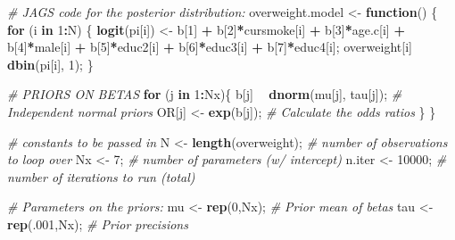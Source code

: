 \documentclass[
  11pt,
]{article}
\newenvironment{Shaded}{\begin{snugshade}}{\end{snugshade}}
\newcommand{\CommentTok}[1]{\textcolor[rgb]{0.56,0.35,0.01}{\textit{#1}}}
\newcommand{\ControlFlowTok}[1]{\textcolor[rgb]{0.13,0.29,0.53}{\textbf{#1}}}
\newcommand{\DecValTok}[1]{\textcolor[rgb]{0.00,0.00,0.81}{#1}}
\newcommand{\KeywordTok}[1]{\textcolor[rgb]{0.13,0.29,0.53}{\textbf{#1}}}
\newcommand{\NormalTok}[1]{#1}
\newcommand{\OperatorTok}[1]{\textcolor[rgb]{0.81,0.36,0.00}{\textbf{#1}}}
\newcommand{\StringTok}[1]{\textcolor[rgb]{0.31,0.60,0.02}{#1}}
\begin{document}
\begin{Shaded}
\begin{Highlighting}[]
\CommentTok{# JAGS code for the posterior distribution:}
\NormalTok{overweight.model <-}\StringTok{ }\ControlFlowTok{function}\NormalTok{() \{}
    \ControlFlowTok{for}\NormalTok{ (i }\ControlFlowTok{in} \DecValTok{1}\OperatorTok{:}\NormalTok{N) \{}
        \KeywordTok{logit}\NormalTok{(pi[i]) <-}\StringTok{ }
\StringTok{            }\NormalTok{b[}\DecValTok{1}\NormalTok{] }\OperatorTok{+}\StringTok{ }
\StringTok{            }\NormalTok{b[}\DecValTok{2}\NormalTok{]}\OperatorTok{*}\NormalTok{cursmoke[i] }\OperatorTok{+}\StringTok{ }
\StringTok{            }\NormalTok{b[}\DecValTok{3}\NormalTok{]}\OperatorTok{*}\NormalTok{age.c[i] }\OperatorTok{+}\StringTok{ }
\StringTok{            }\NormalTok{b[}\DecValTok{4}\NormalTok{]}\OperatorTok{*}\NormalTok{male[i] }\OperatorTok{+}\StringTok{ }
\StringTok{            }\NormalTok{b[}\DecValTok{5}\NormalTok{]}\OperatorTok{*}\NormalTok{educ2[i] }\OperatorTok{+}\StringTok{ }
\StringTok{            }\NormalTok{b[}\DecValTok{6}\NormalTok{]}\OperatorTok{*}\NormalTok{educ3[i] }\OperatorTok{+}\StringTok{ }
\StringTok{            }\NormalTok{b[}\DecValTok{7}\NormalTok{]}\OperatorTok{*}\NormalTok{educ4[i];}
\NormalTok{        overweight[i] }\OperatorTok{~}\StringTok{ }\KeywordTok{dbin}\NormalTok{(pi[i], }\DecValTok{1}\NormalTok{);}
\NormalTok{    \}}
    
\CommentTok{# PRIORS ON BETAS}
\ControlFlowTok{for}\NormalTok{ (j }\ControlFlowTok{in} \DecValTok{1}\OperatorTok{:}\NormalTok{Nx)\{}
\NormalTok{    b[j] }\OperatorTok{~}\StringTok{ }\KeywordTok{dnorm}\NormalTok{(mu[j], }
\NormalTok{                 tau[j]); }\CommentTok{# Independent normal priors}
\NormalTok{    OR[j] <-}\StringTok{ }\KeywordTok{exp}\NormalTok{(b[j]); }\CommentTok{# Calculate the odds ratios}
\NormalTok{    \}}
\NormalTok{\}}


\CommentTok{# constants to be passed in}
\NormalTok{N <-}\StringTok{ }\KeywordTok{length}\NormalTok{(overweight); }\CommentTok{# number of observations to loop over}
\NormalTok{Nx <-}\StringTok{ }\DecValTok{7}\NormalTok{; }\CommentTok{# number of parameters (w/ intercept)}
\NormalTok{n.iter <-}\StringTok{ }\DecValTok{10000}\NormalTok{; }\CommentTok{# number of iterations to run (total)}

\CommentTok{# Parameters on the priors:}
\NormalTok{mu <-}\StringTok{ }\KeywordTok{rep}\NormalTok{(}\DecValTok{0}\NormalTok{,Nx); }\CommentTok{# Prior mean of betas}
\NormalTok{tau <-}\StringTok{ }\KeywordTok{rep}\NormalTok{(.}\DecValTok{001}\NormalTok{,Nx); }\CommentTok{# Prior precisions}


\end{Highlighting}
\end{Shaded}
\end{document}
